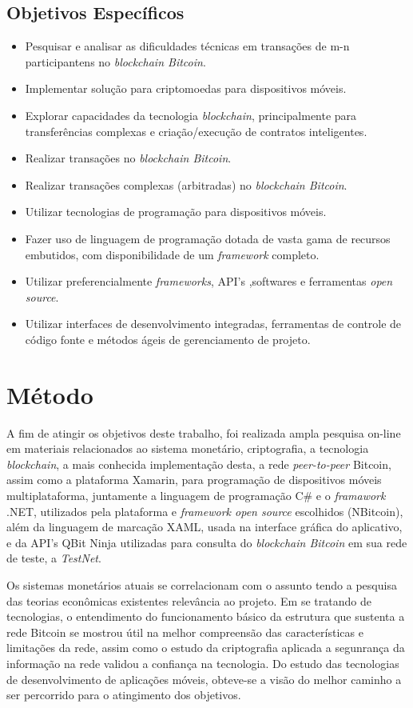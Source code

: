 \documentclass[
	article,			%
	11pt,				%
	oneside,			%
	a4paper,			%
	chapter=TITLE,		%
	section=TITLE,		%
	subsection=TITLE,	%
	subsubsection=TITLE, %
	english,			%
	brazil,				%
	sumario=tradicional
	]{ifrs-artigo-abntex2}
\begin{document}
\subsection{Objetivos Específicos}
\begin{itemize}
    \item Pesquisar e analisar as dificuldades técnicas em transações de m-n participantens no \textit{blockchain Bitcoin}.
	\item Implementar solução para criptomoedas para dispositivos móveis.
	\item Explorar capacidades da tecnologia \textit{blockchain}, principalmente para transferências complexas e criação/execução de contratos inteligentes.
	\item Realizar transações no \textit{blockchain Bitcoin}.
	\item Realizar transações complexas (arbitradas) no \textit{blockchain Bitcoin}.
	\item Utilizar tecnologias de programação para dispositivos móveis.
	\item Fazer uso de linguagem de programação dotada de vasta gama de recursos embutidos, com disponibilidade de um \textit{framework} completo.
	\item Utilizar preferencialmente \textit{frameworks}, API's ,softwares e ferramentas \textit{open source}.
	\item Utilizar interfaces de desenvolvimento integradas, ferramentas de controle de código fonte e métodos ágeis de gerenciamento de projeto. 
\end{itemize}

\section{Método}
A fim de atingir os objetivos deste trabalho, foi realizada ampla pesquisa on-line em materiais relacionados ao sistema monetário, criptografia, a tecnologia \textit{blockchain}, a mais conhecida implementação desta, a rede \textit{peer-to-peer} Bitcoin, assim como a plataforma Xamarin, para programação de dispositivos móveis multiplataforma, juntamente a linguagem de programação C{\#} e o \textit{framawork} .NET, utilizados pela plataforma e \textit{framework open source} escolhidos (NBitcoin), além da linguagem de marcação XAML, usada na interface gráfica do aplicativo, e da API's  QBit Ninja utilizadas para consulta do \textit{blockchain Bitcoin} em sua rede de teste, a \textit{TestNet}.

Os sistemas monetários atuais se correlacionam com o assunto tendo a pesquisa das teorias econômicas existentes relevância ao projeto. Em se tratando de tecnologias, o entendimento do funcionamento básico da estrutura que sustenta a rede Bitcoin se mostrou útil na melhor compreensão das características e limitações da rede, assim como o estudo da criptografia aplicada a segunrança da informação na rede validou a confiança na tecnologia. Do estudo das tecnologias de desenvolvimento de aplicações móveis, obteve-se a visão do melhor caminho a ser percorrido para o atingimento dos objetivos.
\end{document}
